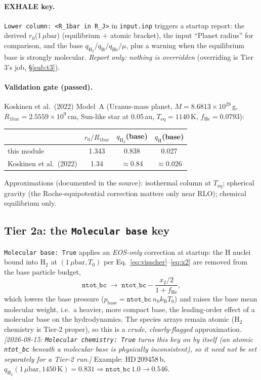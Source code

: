 \documentclass[english,a4paper]{my_memo}
\newcommand{\ubar}{\mu\mathrm{bar}}
\newcommand{\qHH}{q_{\mathrm{H_2}}}
\begin{document}
\paragraph{EXHALE key.} \texttt{Lower column: <R\_1bar in R\_J>} in \texttt{input.inp}
triggers a startup report: the derived $r_0$(1\,$\ubar$) (equilibrium $+$ atomic bracket),
the input ``Planet radius'' for comparison, and the base $\qHH/q_\mathrm{H}/q_\mathrm{He}/\mu$,
plus a warning when the equilibrium base is strongly molecular. \emph{Report only:
nothing is overridden} (overriding is Tier 3's job, \S\ref{sub:t3}).

\paragraph{Validation gate (passed).} Koskinen et al.\ (2022) Model~A (Uranus-mass planet,
$M=8.6813\times10^{28}$\,g, $R_\mathrm{1bar}=2.5559\times10^{9}$\,cm, Sun-like star at
0.05\,au, $T_\mathrm{eq}=1140$\,K, $f_\mathrm{He}=0.0793$):
\begin{center}\small
\begin{tabular}{@{}lccc@{}}
\toprule
 & $r_0/R_\mathrm{1bar}$ & $\qHH$(base) & $q_\mathrm{H}$(base) \\
\midrule
this module & 1.343 & 0.838 & 0.027 \\
Koskinen et al.\ (2022) & 1.34 & $\approx$0.84 & $\approx$0.026 \\
\bottomrule
\end{tabular}
\end{center}
Approximations (documented in the source): isothermal column at $T_\mathrm{eq}$;
spherical gravity (the Roche-equipotential correction matters only near RLO); chemical
equilibrium only.

\subsection{Tier 2a: the \texttt{Molecular base} key}\label{sub:t2a}

\texttt{Molecular base: True} applies an \emph{EOS-only} correction at startup: the H
nuclei bound into H$_2$ at $(1\,\ubar, T_0)$ per Eq.~\eqref{eq:visscher}--\eqref{eq:x2}
are removed from the base particle budget,
\begin{equation}
  \mathtt{ntot\_bc} \;\to\; \mathtt{ntot\_bc} - \frac{x_2/2}{1+f_\mathrm{He}},
\end{equation}
which lowers the base pressure ($p_\mathrm{base}= \mathtt{ntot\_bc}\,n_0 k_\mathrm{B}T_0$)
and raises the base mean molecular weight, i.e.\ a heavier, more compact base, the
leading-order effect of a molecular base on the hydrodynamics. The species arrays remain
atomic (H$_2$ chemistry is Tier-2 proper), so this is a \emph{crude, clearly-flagged}
approximation. \emph{[2026-08-15: \texttt{Molecular chemistry: True} turns this
key on by itself (an atomic \texttt{ntot\_bc} beneath a molecular base is
physically inconsistent), so it need not be set separately for a Tier-2 run.]} Example: HD\,209458\,b, $\qHH(1\,\ubar,1450\,\mathrm{K})=0.831
\Rightarrow \mathtt{ntot\_bc}\,1.0\to0.546$.
\end{document}
